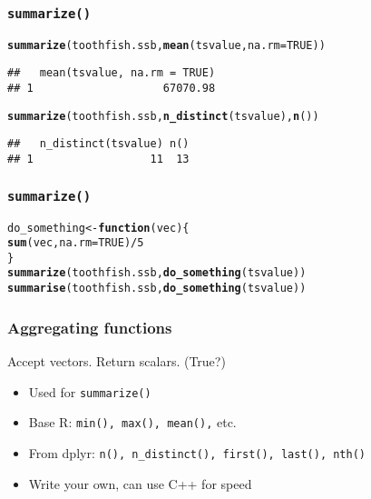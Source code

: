 \documentclass{beamer}\usepackage[]{graphicx}\usepackage[]{color}
\makeatletter
\newcommand{\hlnum}[1]{\textcolor[rgb]{0.686,0.059,0.569}{#1}}%
\newcommand{\hlopt}[1]{\textcolor[rgb]{0,0,0}{#1}}%
\newcommand{\hlstd}[1]{\textcolor[rgb]{0.345,0.345,0.345}{#1}}%
\newcommand{\hlkwa}[1]{\textcolor[rgb]{0.161,0.373,0.58}{\textbf{#1}}}%
\newcommand{\hlkwb}[1]{\textcolor[rgb]{0.69,0.353,0.396}{#1}}%
\newcommand{\hlkwc}[1]{\textcolor[rgb]{0.333,0.667,0.333}{#1}}%
\newcommand{\hlkwd}[1]{\textcolor[rgb]{0.737,0.353,0.396}{\textbf{#1}}}%
\newenvironment{kframe}{%
 \def\at@end@of@kframe{}%
 \ifinner\ifhmode%
  \def\at@end@of@kframe{\end{minipage}}%
  \begin{minipage}{\columnwidth}%
 \fi\fi%
 \def\FrameCommand##1{\hskip\@totalleftmargin \hskip-\fboxsep
 \colorbox{shadecolor}{##1}\hskip-\fboxsep
     \hskip-\linewidth \hskip-\@totalleftmargin \hskip\columnwidth}%
 \MakeFramed {\advance\hsize-\width
   \@totalleftmargin\z@ \linewidth\hsize
   \@setminipage}}%
 {\par\unskip\endMakeFramed%
 \at@end@of@kframe}
\newenvironment{knitrout}{}{} %
\makeatother
\begin{document}

\begin{frame}[fragile]
  \frametitle{\texttt{summarize()}}
\begin{knitrout}
\color{fgcolor}\begin{kframe}
\begin{alltt}
\hlkwd{summarize}\hlstd{(toothfish.ssb,} \hlkwd{mean}\hlstd{(tsvalue,} \hlkwc{na.rm} \hlstd{=} \hlnum{TRUE}\hlstd{))}
\end{alltt}
\begin{verbatim}
##   mean(tsvalue, na.rm = TRUE)
## 1                    67070.98
\end{verbatim}
\begin{alltt}
\hlkwd{summarize}\hlstd{(toothfish.ssb,} \hlkwd{n_distinct}\hlstd{(tsvalue),} \hlkwd{n}\hlstd{())}
\end{alltt}
\begin{verbatim}
##   n_distinct(tsvalue) n()
## 1                  11  13
\end{verbatim}
\end{kframe}
\end{knitrout}
\end{frame}

\begin{frame}[fragile]
  \frametitle{\texttt{summarize()}}
\begin{knitrout}
\color{fgcolor}\begin{kframe}
\begin{alltt}
\hlstd{do_something} \hlkwb{<-} \hlkwa{function}\hlstd{(}\hlkwc{vec}\hlstd{) \{}
  \hlkwd{sum}\hlstd{(vec,} \hlkwc{na.rm} \hlstd{=} \hlnum{TRUE}\hlstd{)}\hlopt{/}\hlnum{5}
\hlstd{\}}
\hlkwd{summarize}\hlstd{(toothfish.ssb,} \hlkwd{do_something}\hlstd{(tsvalue))}
\hlkwd{summarise}\hlstd{(toothfish.ssb,} \hlkwd{do_something}\hlstd{(tsvalue))}
\end{alltt}
\end{kframe}
\end{knitrout}
\end{frame}

\begin{frame}[fragile]
  \frametitle{Aggregating functions}
  Accept vectors. Return scalars. (True?)
  \begin{itemize}
    \item Used for \verb;summarize();
    \item Base R: \verb;min(), max(), mean(),; etc.
    \item From dplyr: \verb;n(), n_distinct(), first(), last(), nth();
    \item Write your own, can use C++ for speed
  \end{itemize}
\end{frame}
\end{document}
